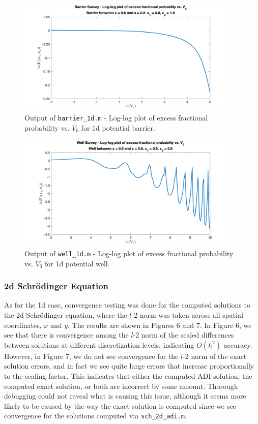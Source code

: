 \documentclass[10pt]{article}
\def\code#1{\texttt{#1}} %
\begin{document}
\begin{figure}[H]
\centering
\includegraphics[width=0.95\textwidth]{problem1/barrier_1d.png}
\caption{Output of \code{barrier\_1d.m} - 
Log-log plot of excess fractional probability vs. $V_0$ for 1d potential barrier.}
\end{figure}
\begin{figure}[H]
\centering
\includegraphics[width=0.95\textwidth]{problem1/well_1d.png}
\caption{Output of \code{well\_1d.m} - 
Log-log plot of excess fractional probability vs. $V_0$ for 1d potential well.}
\end{figure}

\subsubsection*{2d Schrödinger Equation}

As for the 1d case, convergence testing was done for the computed solutions to the 2d Schrödinger 
equation, where the $l$-2 norm was taken across all spatial coordinates, $x$ and $y$. The results 
are shown in Figures 6 and 7. In Figure 6, we see that there is convergence among the $l$-2 norm of
the scaled differences between solutions at different discretization levels, indicating $O(h^2)$
accuracy. However, in Figure 7, we do not see convergence for the $l$-2 norm of the exact solution
errors, and in fact we see quite large errors that increase proportionally to the scaling factor. 
This indicates that either the computed ADI solution, the computed exact solution, or both are 
incorrect by some amount. Thorough debugging could not reveal what is causing this issue, although 
it seems more likely to be caused by the way the exact solution is computed since we see convergence 
for the solutions computed via \code{sch\_2d\_adi.m}.
\end{document}

